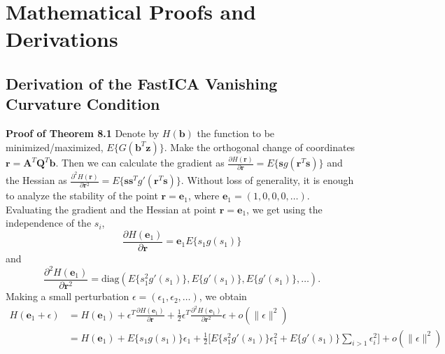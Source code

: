 \documentclass[12pt,a4paper,twoside,openany]{book}
\begin{document}
\appendix
\chapter{Mathematical Proofs and Derivations}

\section{Derivation of the FastICA Vanishing Curvature Condition}
\label{app:fastica_proof}

\textbf{Proof of Theorem 8.1} \cite[Chapter 8]{hyvarinen2001} Denote by $H(\mathbf{b})$ the function to be minimized/maximized, $E\{G(\mathbf{b}^T \mathbf{z})\}$. 
Make the orthogonal change of coordinates $\mathbf{r} = \mathbf{A}^T \mathbf{Q}^T \mathbf{b}$. 
Then we can calculate the gradient as $\frac{\partial H(\mathbf{r})}{\partial \mathbf{r}} = E\{\mathbf{s}g(\mathbf{r}^T \mathbf{s})\}$ and 
the Hessian as $\frac{\partial^2 H(\mathbf{r})}{\partial \mathbf{r}^2} = E\{\mathbf{s}\mathbf{s}^T g'(\mathbf{r}^T \mathbf{s})\}$. Without loss of generality, 
it is enough to analyze the stability of the point $\mathbf{r} = \mathbf{e}_1$, where $\mathbf{e}_1 = (1, 0, 0, 0, \dots)$. 
Evaluating the gradient and the Hessian at point $\mathbf{r} = \mathbf{e}_1$, we get using the independence of the $s_i$,
\begin{equation}
    \frac{\partial H(\mathbf{e}_1)}{\partial \mathbf{r}} = \mathbf{e}_1 E\{s_1 g(s_1)\}
\end{equation}
and
\begin{equation}
    \frac{\partial^2 H(\mathbf{e}_1)}{\partial \mathbf{r}^2} = \text{diag}(E\{s_1^2 g'(s_1)\}, E\{g'(s_1)\}, E\{g'(s_1)\}, \dots).
\end{equation}
Making a small perturbation $\epsilon = (\epsilon_1, \epsilon_2, \dots)$, we obtain
\begin{equation}
\begin{aligned}
    H(\mathbf{e}_1 + \epsilon) &= H(\mathbf{e}_1) + \epsilon^T \frac{\partial H(\mathbf{e}_1)}{\partial \mathbf{r}} + \frac{1}{2} \epsilon^T \frac{\partial^2 H(\mathbf{e}_1)}{\partial \mathbf{r}^2} \epsilon + o(\|\epsilon\|^2) \\
    &= H(\mathbf{e}_1) + E\{s_1 g(s_1)\} \epsilon_1 + \frac{1}{2} \Big[ E\{s_1^2 g'(s_1)\} \epsilon_1^2 + E\{g'(s_1)\} \sum_{i>1} \epsilon_i^2 \Big] + o(\|\epsilon\|^2)
\end{aligned}
\end{equation}
\end{document}
